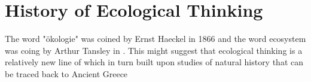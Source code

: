 \section {History of Ecological Thinking}

The word "ökologie" was coined by Ernst Haeckel in 1866 and the word ecosystem was coing by Arthur Tansley in . This might suggest that ecological thinking is a relatively new line of which in turn built upon studies of natural history that can be traced back to Ancient Greece
